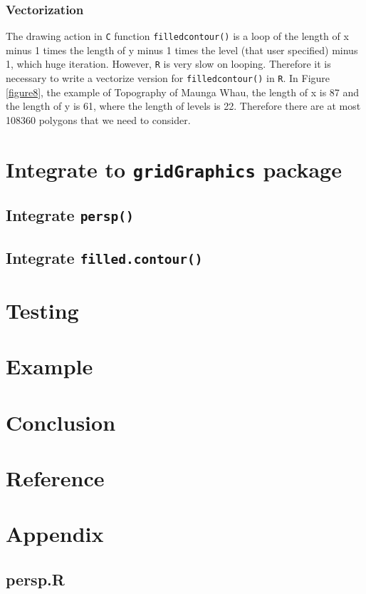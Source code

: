 \documentclass[paper=a4, fontsize=11pt]{report}
\begin{document}
\subsection{Vectorization}
The drawing action in \texttt{C} function \texttt{filledcontour()} is a loop of the length of x minus 1 times the length of y minus 1 times the level (that user specified) minus 1, which huge iteration. However, \texttt{R} is very slow on looping. Therefore it is necessary to write a vectorize version for \texttt{filledcontour()} in \texttt{R}. In Figure \ref{figure8}, the example of Topography of Maunga Whau, the length of x is 87 and the length of y is 61, where the length of levels is 22. Therefore there are at most 108360 polygons that we need to consider.

\chapter{Integrate to \texttt{gridGraphics} package}
\section{Integrate \texttt{persp()}}
\section{Integrate \texttt{filled.contour()}}

\chapter{Testing}
\chapter{Example}
\chapter{Conclusion}
\chapter{Reference}
\chapter{Appendix}
\section{persp.R}
\end{document}
